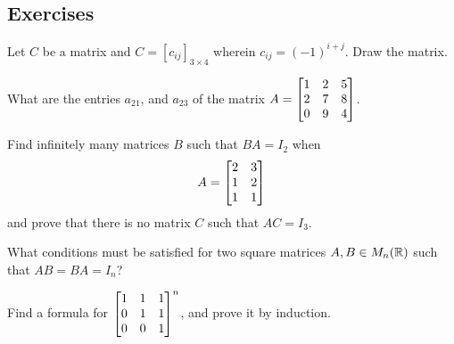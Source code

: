 \newpage
\subsection{Exercises}
\begin{problem}
Let $C$ be a matrix and $C = [c_{ij}]_{3 \times 4}$ wherein $c_{ij} = (-1)^{i+j}$. Draw the matrix.
\end{problem}

\begin{problem}
What are the entries $a_{21}$, and $a_{23}$ of the matrix $A = \begin{bmatrix} 1 & 2 & 5 \\ 2 & 7 & 8 \\ 0 & 9 & 4 \end{bmatrix}$.
\end{problem}

\begin{problem}
Find infinitely many matrices $B$ such that $BA = I_2$ when
$$A = \begin{bmatrix} 2 & 3 \\ 1 & 2 \\ 1 & 1 \end{bmatrix}$$
and prove that there is no matrix $C$ such that $AC = I_3$.
\end{problem}

\begin{problem}
What conditions must be satisfied for two square matrices $A, B \in M_n(\mathbb{R})$ such that $AB = BA = I_n$?
\end{problem}

\begin{problem}
Find a formula for $\begin{bmatrix} 1 & 1 & 1 \\ 0 & 1 & 1 \\ 0 & 0 & 1 \end{bmatrix}^n$, and prove it by induction.
\end{problem}